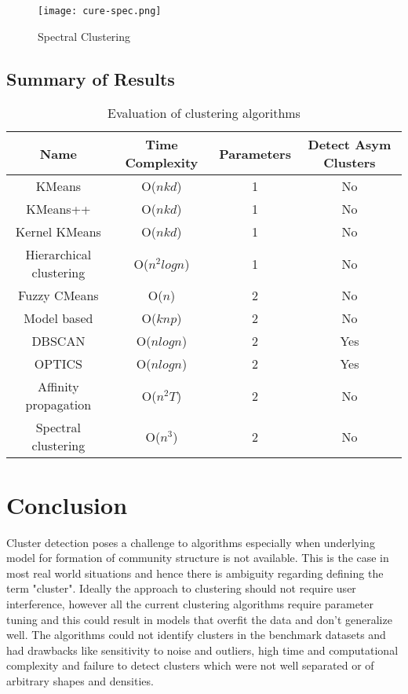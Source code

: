 \begin{figure}[H]
\centering
\texttt{[image: cure-spec.png]}
\caption{Spectral Clustering}
\label{fig 1}
\end{figure}

\subsection{Summary of Results}

\begin{table}[H]
\renewcommand{\arraystretch}{1.3}
\caption{Evaluation of clustering algorithms}
\label{table}
\centering
\begin{tabular}{|c|c|c|c|}
  \hline
\multicolumn{1}{|c|}{\textbf{Name}} & \multicolumn{1}{c|}{\textbf{ Time Complexity}} & \multicolumn{1}{c|}{\textbf{Parameters}} & \multicolumn{1}{c|}{\textbf{Detect Asym Clusters}}  \\
  \hline
  KMeans & O($nkd$) & 1 & No\\
  \hline
  KMeans++ & O($nkd$) & 1 & No\\
  \hline
  Kernel KMeans & O($nkd$) & 1 & No\\
  \hline
  Hierarchical clustering & O($n^2logn$) & 1 & No\\
  \hline
  Fuzzy CMeans & O($n$) & 2 & No\\
  \hline
  Model based & O($knp$) & 2 & No\\
  \hline
  DBSCAN & O($nlogn$) & 2 & Yes\\
  \hline
  OPTICS & O($nlogn$) & 2 & Yes\\
  \hline
  Affinity propagation & O($n^2T$) & 2 & No\\
  \hline
  Spectral clustering & O($n^3$) & 2 & No\\
 \hline
\end{tabular}
\end{table}

\section{Conclusion}
Cluster detection poses a challenge to algorithms especially when underlying model for formation of community structure is not available. This is the case in most real world situations and hence there is ambiguity regarding defining the term "cluster". Ideally the approach to clustering should not require user interference, however all the current clustering algorithms require parameter tuning and this could result in models that overfit the data and don't generalize well. The algorithms could not identify clusters in the benchmark datasets and had drawbacks like sensitivity to noise and outliers, high time and computational complexity and failure to detect clusters which were not well separated or of arbitrary shapes and densities.       









